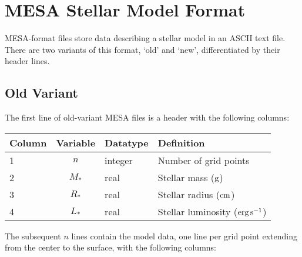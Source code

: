 \documentclass{article}
\newcommand{\Rstar}{\ensuremath{R_{\ast}}}
\newcommand{\Mstar}{\ensuremath{M_{\ast}}}
\newcommand{\Lstar}{\ensuremath{L_{\ast}}}
\newcommand{\cm}{\ensuremath{{\rm cm}}}
\newcommand{\gram}{\ensuremath{{\rm g}}}
\newcommand{\second}{\ensuremath{{\rm s}}}
\newcommand{\erg}{\ensuremath{{\rm erg}}}
\begin{document}
\section*{MESA Stellar Model Format}

MESA-format files store data describing a stellar model in an ASCII
text file. There are two variants of this format, `old' and `new',
differentiated by their header lines.

\subsection*{Old Variant}

The first line of old-variant MESA files is a header with the following
columns:

\begin{table}[h!]
\begin{tabular}{|l|c|l|l|} \hline
Column & Variable & Datatype & Definition \\ \hline
1      & $n$ & integer & Number of grid points \\
2      & \Mstar & real & Stellar mass ($\gram$) \\
3      & \Rstar & real & Stellar radius ($\cm$) \\
4      & \Lstar & real & Stellar luminosity ($\erg\,\second^{-1}$) \\ \hline
\end{tabular}
\end{table}

The subsequent $n$ lines contain the model data, one line per
grid point extending from the center to the surface, with the following columns:
\end{document}

